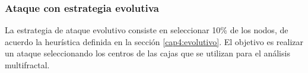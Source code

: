 \subsubsection{Ataque con estrategia evolutiva}

La estrategia de ataque evolutivo consiste en seleccionar 10\% de los nodos, de acuerdo la heurística definida en la sección \ref{cap4:evolutivo}. El objetivo es realizar un ataque seleccionando los centros de las cajas que se utilizan para el análisis multifractal.